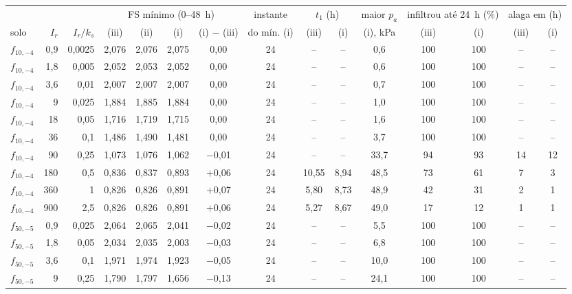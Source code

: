 \begin{tabular}{lrr|cccc|c|cc|c|cc|cc}
\toprule
 & & & \multicolumn{4}{c|}{FS mínimo (0--48~h)} & instante & \multicolumn{2}{c|}{$t_1$ (h)} & maior $p_a$ & \multicolumn{2}{c|}{infiltrou até 24~h (\%)} & \multicolumn{2}{c}{alaga em (h)}\\
solo & $I_r$ & $I_r/k_s$ & (iii) & (ii) & (i) & (i) $-$ (iii) & do mín. (i) & (iii) & (i) & (i), kPa & (iii) & (i) & (iii) & (i)\\
\midrule
$f_{10,-4}$ & 0{,}9 & 0{,}0025 & 2{,}076 & 2{,}076 & 2{,}075 & 0{,}00 & 24 & -- & -- & 0{,}6 & 100 & 100 & -- & --\\
$f_{10,-4}$ & 1{,}8 & 0{,}005 & 2{,}052 & 2{,}053 & 2{,}052 & 0{,}00 & 24 & -- & -- & 0{,}6 & 100 & 100 & -- & --\\
$f_{10,-4}$ & 3{,}6 & 0{,}01 & 2{,}007 & 2{,}007 & 2{,}007 & 0{,}00 & 24 & -- & -- & 0{,}7 & 100 & 100 & -- & --\\
$f_{10,-4}$ & 9 & 0{,}025 & 1{,}884 & 1{,}885 & 1{,}884 & 0{,}00 & 24 & -- & -- & 1{,}0 & 100 & 100 & -- & --\\
$f_{10,-4}$ & 18 & 0{,}05 & 1{,}716 & 1{,}719 & 1{,}715 & 0{,}00 & 24 & -- & -- & 1{,}6 & 100 & 100 & -- & --\\
$f_{10,-4}$ & 36 & 0{,}1 & 1{,}486 & 1{,}490 & 1{,}481 & 0{,}00 & 24 & -- & -- & 3{,}7 & 100 & 100 & -- & --\\
$f_{10,-4}$ & 90 & 0{,}25 & 1{,}073 & 1{,}076 & 1{,}062 & $-$0{,}01 & 24 & -- & -- & 33{,}7 & 94 & 93 & 14 & 12\\
$f_{10,-4}$ & 180 & 0{,}5 & 0{,}836 & 0{,}837 & 0{,}893 & $+$0{,}06 & 24 & 10{,}55 & 8{,}94 & 48{,}5 & 73 & 61 & 7 & 3\\
$f_{10,-4}$ & 360 & 1 & 0{,}826 & 0{,}826 & 0{,}891 & $+$0{,}07 & 24 & 5{,}80 & 8{,}73 & 48{,}9 & 42 & 31 & 2 & 1\\
$f_{10,-4}$ & 900 & 2{,}5 & 0{,}826 & 0{,}826 & 0{,}891 & $+$0{,}06 & 24 & 5{,}27 & 8{,}67 & 49{,}0 & 17 & 12 & 1 & 1\\
\midrule
$f_{50,-5}$ & 0{,}9 & 0{,}025 & 2{,}064 & 2{,}065 & 2{,}041 & $-$0{,}02 & 24 & -- & -- & 5{,}5 & 100 & 100 & -- & --\\
$f_{50,-5}$ & 1{,}8 & 0{,}05 & 2{,}034 & 2{,}035 & 2{,}003 & $-$0{,}03 & 24 & -- & -- & 6{,}8 & 100 & 100 & -- & --\\
$f_{50,-5}$ & 3{,}6 & 0{,}1 & 1{,}971 & 1{,}974 & 1{,}923 & $-$0{,}05 & 24 & -- & -- & 10{,}0 & 100 & 100 & -- & --\\
$f_{50,-5}$ & 9 & 0{,}25 & 1{,}790 & 1{,}797 & 1{,}656 & $-$0{,}13 & 24 & -- & -- & 24{,}1 & 100 & 100 & -- & --\\

\end{tabular}
